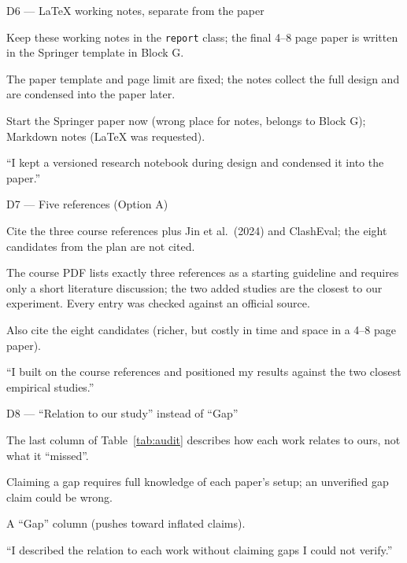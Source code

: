 \documentclass[11pt,a4paper]{report}
\begin{document}
\begin{decisionbox}{D6 --- LaTeX working notes, separate from the paper}
\begin{description}[nosep, leftmargin=0pt]
  \item[Decision.] Keep these working notes in the \texttt{report} class; the
    final 4--8 page paper is written in the Springer template in Block G.
  \item[Why.] The paper template and page limit are fixed; the notes collect
    the full design and are condensed into the paper later.
  \item[Alternatives.] Start the Springer paper now (wrong place for notes,
    belongs to Block G); Markdown notes (LaTeX was requested).
  \item[Interview line.] ``I kept a versioned research notebook during design
    and condensed it into the paper.''
\end{description}
\end{decisionbox}

\begin{decisionbox}{D7 --- Five references (Option A)}
\begin{description}[nosep, leftmargin=0pt]
  \item[Decision.] Cite the three course references plus Jin et al.\ (2024)
    and ClashEval; the eight candidates from the plan are not cited.
  \item[Why.] The course PDF lists exactly three references as a starting
    guideline and requires only a short literature discussion; the two added
    studies are the closest to our experiment. Every entry was checked
    against an official source.
  \item[Alternatives.] Also cite the eight candidates (richer, but costly in
    time and space in a 4--8 page paper).
  \item[Interview line.] ``I built on the course references and positioned my
    results against the two closest empirical studies.''
\end{description}
\end{decisionbox}

\begin{decisionbox}{D8 --- ``Relation to our study'' instead of ``Gap''}
\begin{description}[nosep, leftmargin=0pt]
  \item[Decision.] The last column of Table~\ref{tab:audit} describes how
    each work relates to ours, not what it ``missed''.
  \item[Why.] Claiming a gap requires full knowledge of each paper's setup;
    an unverified gap claim could be wrong.
  \item[Alternatives.] A ``Gap'' column (pushes toward inflated claims).
  \item[Interview line.] ``I described the relation to each work without
    claiming gaps I could not verify.''
\end{description}
\end{decisionbox}
\end{document}
